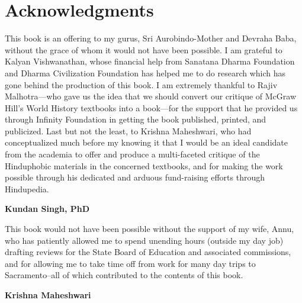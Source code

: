 \chapter*{Acknowledgments}

This book is an offering to my gurus, Sri Aurobindo-Mother and Devraha Baba, without the grace of whom it would not have been possible. I am grateful to Kalyan Vishwanathan, whose financial help from Sanatana Dharma Foundation and Dharma Civilization Foundation has helped me to do research which has gone behind the production of this book. I am extremely thankful to Rajiv Malhotra—who gave us the idea that we should convert our critique of McGraw Hill’s World History textbooks into a book—for the support that he provided us through Infinity Foundation in getting the book published, printed, and publicized. Last but not the least, to Krishna Maheshwari, who had conceptualized much before my knowing it that I would be an ideal candidate from the academia to offer and produce a multi-faceted critique of the Hinduphobic materials in the concerned textbooks, and for making the work possible through his dedicated and arduous fund-raising efforts through Hindupedia.

\begin{flushright}
\textbf{Kundan Singh, PhD}
\end{flushright}


This book would not have been possible without the support of my wife, Annu, who has patiently allowed me to spend unending hours (outside my day job) drafting reviews for the State Board of Education and associated commissions, and for allowing me to take time off from work for many day trips to Sacramento--all of which contributed to the contents of this book.

\begin{flushright}
\textbf{Krishna Maheshwari}
\end{flushright}
